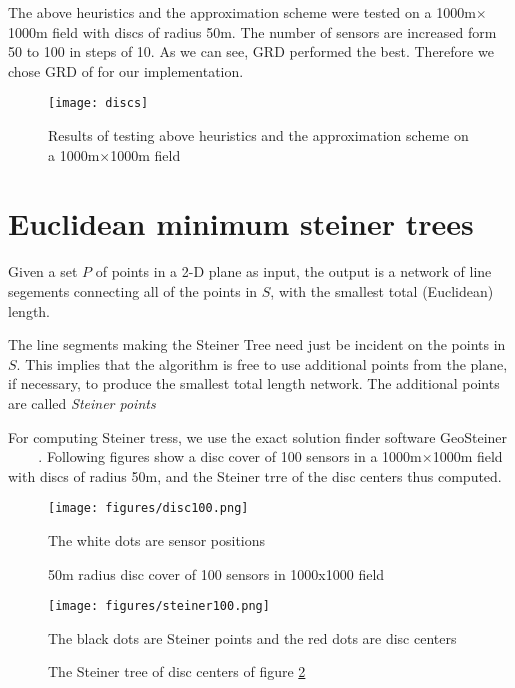 The above heuristics and the approximation scheme were tested on a 1000m$\times$1000m field with discs of radius 50m. The number of sensors are increased form 50 to 100 in steps of 10. As we can see, GRD performed the best. Therefore we chose GRD of for our implementation.

\begin{figure}[H]
\centering
\texttt{[image: discs]}
\caption{Results of testing above heuristics and the approximation scheme on a 1000m$\times$1000m field}\label{fig:discResults}
\end{figure}

\section{Euclidean minimum steiner trees}\label{sec:steinerPoints}

\begin{definition}
Given a set $P$ of points in a 2-D plane as input, the output is a network of line segements connecting all of the points in $S$, with the smallest total (Euclidean) length.
\end{definition}
The line segments making the Steiner Tree need just be incident on the points in $S$. This implies that the algorithm is free to use additional points from the plane, if necessary, to produce the smallest total length network. The additional points are called \emph{Steiner points}

For computing Steiner tress, we use the exact solution finder software GeoSteiner ~\cite{geosteiner1} ~\cite{geosteiner2} ~\cite{geosteiner3}. Following figures show a disc cover of 100 sensors in a 1000m$\times$1000m field with discs of radius 50m, and the Steiner trre of the disc centers thus computed.

\begin{figure}[H]
\centering
\texttt{[image: figures/disc100.png]}
\caption{50m radius disc cover of 100 sensors in 1000x1000 field} \label{fig:disc100}
\medskip
\small
The white dots are sensor positions
\end{figure}

\begin{figure}[H]
\centering
\texttt{[image: figures/steiner100.png]}
\caption{The Steiner tree of disc centers of figure \ref{fig:disc100}}
\medskip
\small
The black dots are Steiner points and the red dots are disc centers
\end{figure}
